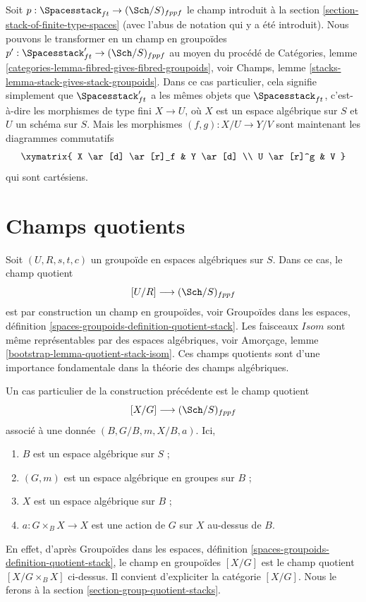 \noindent
Soit $p : \Spacesstack_{ft} \to (\Sch/S)_{fppf}$ le champ
introduit à la
section \ref{section-stack-of-finite-type-spaces}
(avec l'abus de notation qui y a été introduit).
Nous pouvons le transformer en un champ en groupoïdes
$p' : \Spacesstack_{ft}' \to (\Sch/S)_{fppf}$ au moyen
du procédé de
Catégories, lemme \ref{categories-lemma-fibred-gives-fibred-groupoids},
voir
Champs, lemme \ref{stacks-lemma-stack-gives-stack-groupoids}.
Dans ce cas particulier, cela signifie simplement que $\Spacesstack_{ft}'$
a les mêmes objets que $\Spacesstack_{ft}$, c'est-à-dire les morphismes de type fini
$X \to U$, où $X$ est un espace algébrique sur $S$ et $U$ un schéma
sur $S$. Mais les morphismes $(f, g) : X/U \to Y/V$ sont maintenant les
diagrammes commutatifs
$$
\xymatrix{
X \ar[d] \ar[r]_f & Y \ar[d] \\
U \ar[r]^g & V
}
$$
qui sont cartésiens.



\section{Champs quotients}
\label{section-quotient-stacks}

\noindent
Soit $(U, R, s, t, c)$ un groupoïde en espaces algébriques sur $S$.
Dans ce cas, le champ quotient
$$
[U/R] \longrightarrow (\Sch/S)_{fppf}
$$
est par construction un champ en groupoïdes, voir
Groupoïdes dans les espaces,
définition \ref{spaces-groupoids-definition-quotient-stack}.
Les faisceaux $\mathit{Isom}$ sont même
représentables par des espaces algébriques, voir
Amorçage, lemme \ref{bootstrap-lemma-quotient-stack-isom}.
Ces champs quotients sont d'une importance fondamentale dans la théorie des
champs algébriques.

\medskip\noindent
Un cas particulier de la construction précédente est le champ quotient
$$
[X/G] \longrightarrow (\Sch/S)_{fppf}
$$
associé à une donnée $(B, G/B, m, X/B, a)$. Ici,
\begin{enumerate}
\item $B$ est un espace algébrique sur $S$ ;
\item $(G, m)$ est un espace algébrique en groupes sur $B$ ;
\item $X$ est un espace algébrique sur $B$ ;
\item $a : G \times_B X \to X$ est une action de $G$ sur $X$ au-dessus de $B$.
\end{enumerate}
En effet, d'après
Groupoïdes dans les espaces,
définition \ref{spaces-groupoids-definition-quotient-stack},
le champ en groupoïdes $[X/G]$ est le
champ quotient $[X/G \times_B X]$ ci-dessus. Il convient
d'expliciter la catégorie $[X/G]$. Nous le ferons à la
section \ref{section-group-quotient-stacks}.



